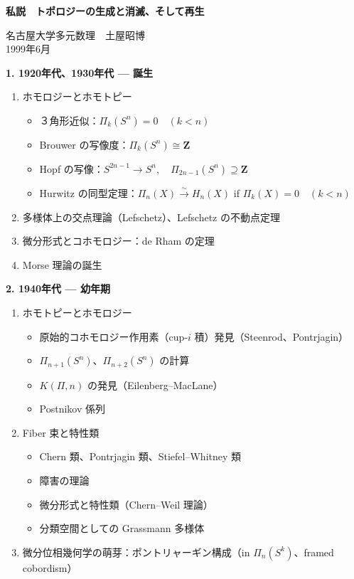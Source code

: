 \documentclass[uplatex,dvipdfmx]{jlreq}
\begin{document}
\newpage

\begin{center}
  {\large\bfseries 私説　トポロジーの生成と消滅、そして再生}
\end{center}
\begin{center}
  名古屋大学多元数理　土屋昭博\\
  1999年6月
\end{center}

\bigskip
\noindent\textbf{1. 1920年代、1930年代 --- 誕生}

\begin{enumerate}
  \item ホモロジーとホモトピー
        \begin{itemize}
          \item ３角形近似：$\Pi_k(S^n) = 0 \quad (k < n)$
          \item Brouwer の写像度：$\Pi_k(S^n) \cong \mathbf{Z}$
          \item Hopf の写像：$S^{2n-1} \longrightarrow S^n,\quad \Pi_{2n-1}(S^n) \supseteq \mathbf{Z}$
          \item Hurwitz の同型定理：$\Pi_n(X) \stackrel{\sim}{\longrightarrow} H_n(X)$
                \quad if $\Pi_k(X) = 0 \quad (k < n)$
        \end{itemize}
  \item 多様体上の交点理論（Lefschetz）、Lefschetz の不動点定理
  \item 微分形式とコホモロジー：de Rham の定理
  \item Morse 理論の誕生
\end{enumerate}

\medskip
\noindent\textbf{2. 1940年代 --- 幼年期}

\begin{enumerate}
  \item ホモトピーとホモロジー
        \begin{itemize}
          \item 原始的コホモロジー作用素（cup-$i$ 積）発見（Steenrod、Pontrjagin）
          \item $\Pi_{n+1}(S^n)$、$\Pi_{n+2}(S^n)$ の計算
          \item $K(\Pi, n)$ の発見（Eilenberg--MacLane）
          \item Postnikov 係列
        \end{itemize}
  \item Fiber 束と特性類
        \begin{itemize}
          \item Chern 類、Pontrjagin 類、Stiefel--Whitney 類
          \item 障害の理論
          \item 微分形式と特性類（Chern--Weil 理論）
          \item 分類空間としての Grassmann 多様体
        \end{itemize}
  \item 微分位相幾何学の萌芽：ポントリャーギン構成（in $\Pi_n(S^k)$、framed cobordism）
\end{enumerate}
\end{document}
